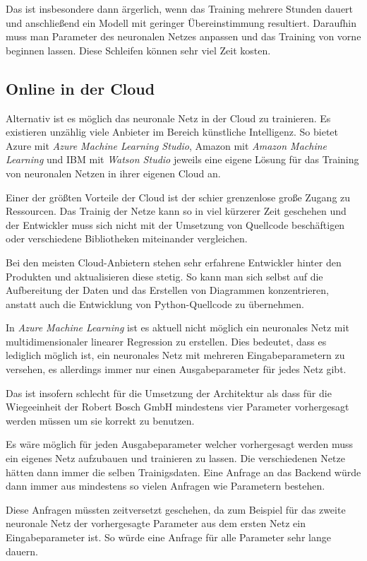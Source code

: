 Das ist insbesondere dann ärgerlich, wenn das Training mehrere Stunden dauert und anschließend ein Modell mit geringer
Übereinstimmung resultiert. Daraufhin muss man Parameter des neuronalen Netzes anpassen und das Training von vorne
beginnen lassen. Diese Schleifen können sehr viel Zeit kosten.

\subsection{Online in der Cloud}
Alternativ ist es möglich das neuronale Netz in der Cloud zu trainieren. Es existieren unzählig viele Anbieter im
Bereich künstliche Intelligenz. So bietet Azure mit \textit{Azure Machine Learning Studio}, Amazon mit
\textit{Amazon Machine Learning} und IBM mit \textit{Watson Studio} jeweils eine eigene Lösung für das Training von
neuronalen Netzen in ihrer eigenen Cloud an.

Einer der größten Vorteile der Cloud ist der schier grenzenlose große Zugang zu Ressourcen. Das Trainig der Netze kann
so in viel kürzerer Zeit geschehen und der Entwickler muss sich nicht mit der Umsetzung von Quellcode beschäftigen oder
verschiedene Bibliotheken miteinander vergleichen.

Bei den meisten Cloud-Anbietern stehen sehr erfahrene Entwickler hinter den Produkten und aktualisieren diese stetig. So
kann man sich selbst auf die Aufbereitung der Daten und das Erstellen von Diagrammen konzentrieren, anstatt auch die
Entwicklung von Python-Quellcode zu übernehmen.

In \textit{Azure Machine Learning} ist es aktuell nicht möglich ein neuronales Netz mit multidimensionaler linearer
Regression zu erstellen. Dies bedeutet, dass es lediglich möglich ist, ein neuronales Netz mit mehreren
Eingabeparametern zu versehen, es allerdings immer nur einen Ausgabeparameter für jedes Netz gibt.

Das ist insofern schlecht für die Umsetzung der Architektur als dass für die Wiegeeinheit der Robert Bosch GmbH
mindestens vier Parameter vorhergesagt werden müssen um sie korrekt zu benutzen.

Es wäre möglich für jeden Ausgabeparameter welcher vorhergesagt werden muss ein eigenes Netz aufzubauen und trainieren
zu lassen. Die verschiedenen Netze hätten dann immer die selben Trainigsdaten. Eine Anfrage an das Backend würde dann
immer aus mindestens so vielen Anfragen wie Parametern bestehen.

Diese Anfragen müssten zeitversetzt geschehen, da zum Beispiel für das zweite neuronale Netz der vorhergesagte Parameter
aus dem ersten Netz ein Eingabeparameter ist. So würde eine Anfrage für alle Parameter sehr lange dauern.

